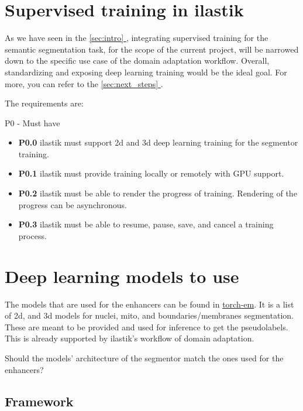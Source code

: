 \documentclass[12pt, a4paper]{article}
\newcommand*{\fullref}[1]{\hyperref[{#1}]{\ref*{#1} \nameref*{#1}}}
\begin{document}
\section{Supervised training in ilastik}

As we have seen in the \fullref{sec:intro}, integrating supervised training for the semantic segmentation task, for the scope of the current project, will be narrowed down to the specific use case of the domain adaptation workflow. Overall, standardizing and exposing deep learning training would be the ideal goal. For more, you can refer to the \fullref{sec:next_steps}.

The requirements are:

P0 - Must have
\begin{itemize}
    \item \textbf{P0.0} ilastik must support 2d and 3d deep learning training for the segmentor training.
    \item \textbf{P0.1} ilastik must provide training locally or remotely with GPU support.
    \item \textbf{P0.2} ilastik must be able to render the progress of training. Rendering of the progress can be asynchronous.
    \item \textbf{P0.3} ilastik must be able to resume, pause, save, and cancel a training process.
\end{itemize}


\section{Deep learning models to use}
\label{sec:deep_models}

The models that are used for the enhancers can be found in \href{https://github.com/constantinpape/torch-em/tree/dd3519ac616920f541bcebe6e4e09914d7d8ce96/experiments/shallow2deep}{torch-em}. It is a list of 2d, and 3d models for nuclei, mito, and boundaries/membranes segmentation. These are meant to be provided and used for inference to get the pseudolabels. This is already supported by ilastik's workflow of domain adaptation.

Should the models' architecture of the segmentor match the ones used for the enhancers?

\subsection{Framework}
\end{document}
